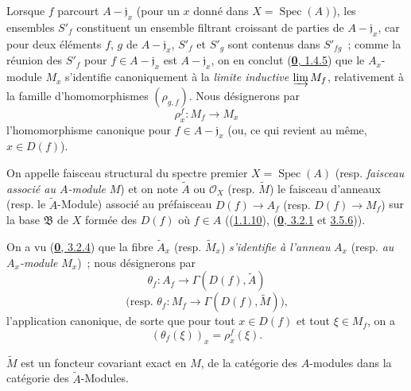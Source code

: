 Lorsque $f$ parcourt $A-\mathfrak{j}_x$ (pour un $x$ donné dans
$X=\operatorname{Spec}(A)$), les ensembles $S'_f$ constituent un ensemble
filtrant croissant de parties de $A-\mathfrak{j}_x$, car pour deux éléments
$f$, $g$ de $A-\mathfrak{j}_x$, $S'_f$ et $S'_g$ sont contenus dans
$S'_{fg}$~; comme la réunion des $S'_f$ pour $f\in A-\mathfrak{j}_x$ est
$A-\mathfrak{j}_x$, on en conclut (\hyperref[0.1.4.5-fr]{\textbf{0}, 1.4.5}) que le
$A_x$-module $M_x$ s'identifie canoniquement à la \emph{limite inductive}
$\varinjlim M_f$, relativement à la famille d'homomorphismes
$(\rho_{g,f})$. Nous désignerons par
\[
  \rho_x^f:M_f\longrightarrow M_x
\]
l'homomorphisme canonique pour $f\in A-\mathfrak{j}_x$ (ou, ce qui revient au
même, $x\in D(f)$).

\begin{definition}[1.3.4]
\label{I.1.3.4-fr}
On appelle faisceau structural du spectre premier
$X=\operatorname{Spec}(A)$ \textup{(resp. \emph{faisceau associé au $A$-module}
$M$)} et on note $\widetilde{A}$ ou $\mathscr{O}_X$ \textup{(resp. $\widetilde{M}$)} le
faisceau d'anneaux \textup{(resp.} le $\widetilde{A}$-Module) associé au préfaisceau
$D(f)\to A_f$ \textup{(resp. $D(f)\to M_f$)} sur la base $\mathfrak{B}$ de
$X$ formée des $D(f)$ où $f\in A$
\textup{((\hyperref[I.1.1.10-fr]{1.1.10}),
(\hyperref[0.3.2.1-fr]{\textbf{0}, 3.2.1} et
\hyperref[0.3.5.6-fr]{3.5.6}))}.
\end{definition}

On a vu (\hyperref[0.3.2.4-fr]{\textbf{0}, 3.2.4}) que la fibre
$\widetilde{A}_x$ (resp. $\widetilde{M}_x$) \emph{s'identifie à l'anneau}
$A_x$ (resp. \emph{au $A_x$-module} $M_x$)~; nous désignerons par
\[
  \theta_f:A_f\longrightarrow\Gamma(D(f),\widetilde{A})
\]
\[
  \text{(resp. }\theta_f:M_f\longrightarrow
  \Gamma(D(f),\widetilde{M})\text{),}
\]
l'application canonique, de sorte que pour tout $x\in D(f)$ et tout
$\xi\in M_f$, on a
\begin{equation}
  (\theta_f(\xi))_x=\rho_x^f(\xi).
  \tag{1.3.4.1}\label{I.1.3.4.1-fr}
\end{equation}

\begin{proposition}[1.3.5]
\label{I.1.3.5-fr}
$\widetilde{M}$ est un foncteur covariant exact en $M$, de la catégorie des
$A$-modules dans la catégorie des $\widetilde{A}$-Modules.
\end{proposition}

